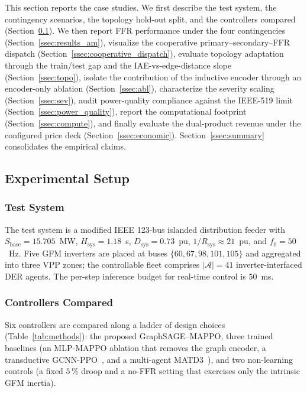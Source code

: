 \label{sec:results}

This section reports the case studies. We first describe the test
system, the contingency scenarios, the topology hold-out split, and
the controllers compared (Section~\ref{ssec:setup}). We then report
FFR performance under the four contingencies
(Section~\ref{ssec:results_am}), visualize the cooperative
primary--secondary--FFR dispatch
(Section~\ref{ssec:cooperative_dispatch}), evaluate topology
adaptation through the train/test gap and the IAE-vs-edge-distance
slope (Section~\ref{ssec:topo}), isolate the contribution of the
inductive encoder through an encoder-only ablation
(Section~\ref{ssec:abl}), characterize the severity scaling
(Section~\ref{ssec:sev}), audit power-quality compliance against the
IEEE-519 limit (Section~\ref{ssec:power_quality}), report the
computational footprint
(Section~\ref{ssec:compute}), and finally evaluate the dual-product
revenue under the configured price deck
(Section~\ref{ssec:economic}). Section~\ref{ssec:summary} consolidates
the empirical claims.

\subsection{Experimental Setup}
\label{ssec:setup}

\subsubsection{Test System}
The test system is a modified IEEE 123-bus islanded distribution
feeder with
$S_{\mathrm{base}}=15.705$~MW,
$H_{\mathrm{sys}}=1.18$~s,
$D_{\mathrm{sys}}=0.73$~pu,
$1/R_{\mathrm{sys}}\approx 21$~pu,
and $f_0=50$~Hz.
Five GFM inverters are placed at buses
$\{60,67,98,101,105\}$ and aggregated into three VPP zones; the
controllable fleet comprises $|\mathcal{A}|=41$ inverter-interfaced
DER agents. The per-step inference budget for real-time control is
$50$~ms.

\subsubsection{Controllers Compared}
Six controllers are compared along a ladder of design choices
(Table~\ref{tab:methods}): the proposed GraphSAGE--MAPPO, three
trained baselines (an MLP-MAPPO ablation that removes the graph
encoder, a transductive GCNN-PPO~\cite{guo2024gcnnppo}, and a
multi-agent MATD3~\cite{li2025matd3}), and two non-learning controls
(a fixed $5$\,\% droop and a no-FFR setting that exercises only the
intrinsic GFM inertia).

